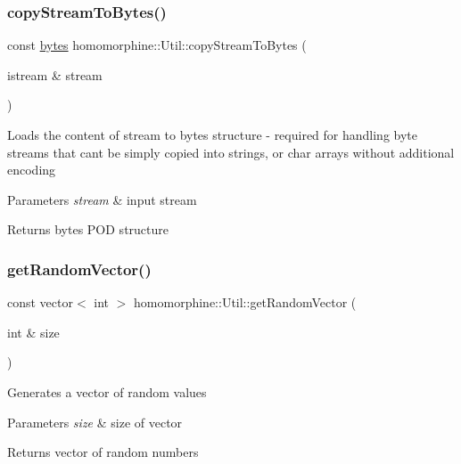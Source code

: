 \subsubsection{\texorpdfstring{copyStreamToBytes()}{copyStreamToBytes()}}
{\footnotesize\ttfamily const \mbox{\hyperlink{structbyte__array__t}{bytes}} homomorphine\+::\+Util\+::copy\+Stream\+To\+Bytes (\begin{DoxyParamCaption}\item[{istream \&}]{stream }\end{DoxyParamCaption})\hspace{0.3cm}{\ttfamily [static]}}

Loads the content of stream to bytes structure -\/ required for handling byte streams that can\textquotesingle{}t be simply copied into strings, or char arrays without additional encoding


\begin{DoxyParams}{Parameters}
{\em stream} & input stream \\
\hline
\end{DoxyParams}
\begin{DoxyReturn}{Returns}
bytes P\+OD structure 
\end{DoxyReturn}
\mbox{\label{classhomomorphine_1_1_util_a2dcf1d83028f3d47ba49b80696fefef7}} 
\subsubsection{\texorpdfstring{getRandomVector()}{getRandomVector()}}
{\footnotesize\ttfamily const vector$<$ int $>$ homomorphine\+::\+Util\+::get\+Random\+Vector (\begin{DoxyParamCaption}\item[{int \&}]{size }\end{DoxyParamCaption})\hspace{0.3cm}{\ttfamily [static]}}

Generates a vector of random values


\begin{DoxyParams}{Parameters}
{\em size} & size of vector \\
\hline
\end{DoxyParams}
\begin{DoxyReturn}{Returns}
vector of random numbers 
\end{DoxyReturn}
\mbox{\label{classhomomorphine_1_1_util_acf2321afce14e9c20ca572159592e0e2}} 

